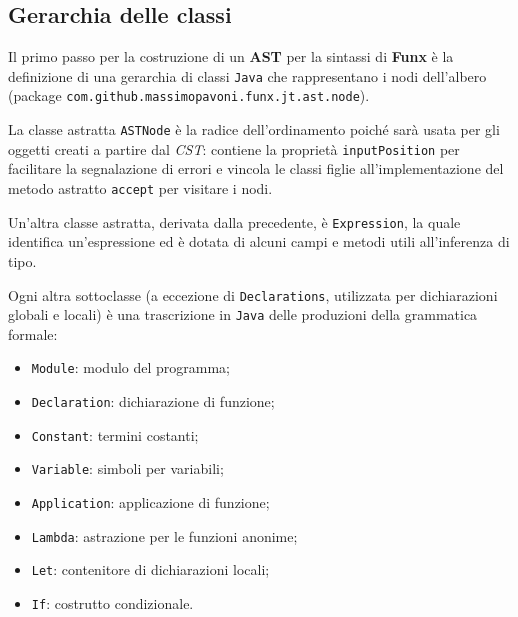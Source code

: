 \subsection{Gerarchia delle classi}
\label{sec:5-5-class-hierarchy}

Il primo passo per la costruzione di un \textbf{AST} per la sintassi di \textbf{Funx} è la definizione
di una gerarchia di classi \texttt{Java} che rappresentano i nodi dell'albero
(package \texttt{com.github.massimopavoni.funx.jt.ast.node}).


La classe astratta \texttt{ASTNode} è la radice dell'ordinamento poiché sarà usata per gli oggetti creati
a partire dal \textit{CST}: contiene la proprietà \texttt{inputPosition} per facilitare la segnalazione di errori
e vincola le classi figlie all'implementazione del metodo astratto \texttt{accept} per visitare i nodi.

\noindent Un'altra classe astratta, derivata dalla precedente, è \texttt{Expression}, la quale identifica
un'espressione ed è dotata di alcuni campi e metodi utili all'inferenza di tipo.


Ogni altra sottoclasse (a eccezione di \texttt{Declarations}, utilizzata per dichiarazioni globali e locali)
è una trascrizione in \texttt{Java} delle produzioni della grammatica formale:
\begin{itemize}
    \item \texttt{Module}: modulo del programma;
    \item \texttt{Declaration}: dichiarazione di funzione;
    \item \texttt{Constant}: termini costanti;
    \item \texttt{Variable}: simboli per variabili;
    \item \texttt{Application}: applicazione di funzione;
    \item \texttt{Lambda}: astrazione per le funzioni anonime;
    \item \texttt{Let}: contenitore di dichiarazioni locali;
    \item \texttt{If}: costrutto condizionale.
\end{itemize}

\newpage

